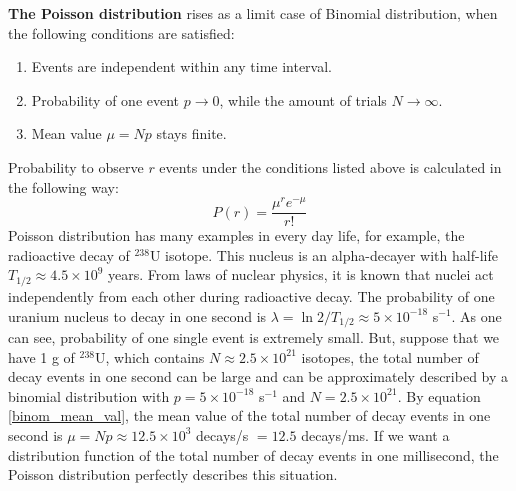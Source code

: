 \documentclass[12pt,a4paper]{report}
\begin{document}
\newpage
\textbf{The Poisson distribution} rises as a limit case of Binomial distribution, when the following conditions are satisfied:
\begin{enumerate}
\item Events are independent within any time interval.
\item Probability of one event $p \rightarrow 0$, while the amount of trials $N \rightarrow \infty$. 
\item Mean value $\mu = Np$ stays finite.
\end{enumerate}
Probability to observe $r$ events under the conditions listed above is calculated in the following way:
\begin{equation*}
P(r) = \frac{\mu^r e^{-\mu}}{r!}
\end{equation*}
Poisson distribution has many examples in every day life, for example, the radioactive decay of $^{238}$U isotope. This nucleus is an alpha-decayer with half-life $T_{1/2} \approx 4.5 \times 10^9$ years. From laws of nuclear physics, it is known that nuclei act independently from each other during radioactive decay. The probability of one uranium nucleus to decay in one second is $\lambda = \ln2 /T_{1/2} \approx 5 \times 10^{-18}$ s$^{-1}$. As one can see, probability of one single event is extremely small. But, suppose that we have 1 g of $^{238}$U, which contains $N \approx 2.5 \times 10^{21}$ isotopes, the total number of decay events in one second can be large and can be approximately described by a binomial distribution with $p = 5 \times 10^{-18}$ s$^{-1}$ and $N = 2.5 \times 10^{21}$. By equation \ref{binom_mean_val}, the mean value of the total number of decay events in one second is $\mu = Np \approx 12.5 \times 10^3$ decays/s $ = 12.5 $ decays/ms. If we want a distribution function of the total number of decay events in one millisecond, the Poisson distribution perfectly describes this situation. \par
\end{document}
